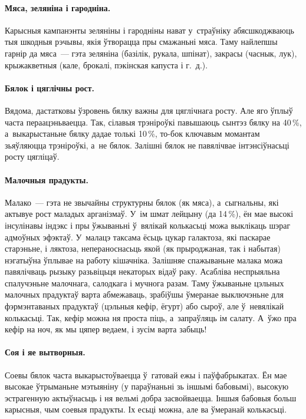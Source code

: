 \paragraph{Мяса, зеляніна і гародніна.}
Карысныя кампанэнты зеляніны і гародніны нават у~страўніку абясшкоджваюць тыя шкодныя рэчывы, якія ўтворацца пры смажаньні мяса. Таму найлепшы гарнір да мяса~--- гэта зеляніна (базілік, рукала, шпінат), закрасы (часнык, лук), крыжакветныя (кале, брокалі, пэкінская капуста і г.~д.).

\paragraph{Бялок і цяглічны рост.}
Вядома, дастатковы ўзровень бялку важны для цяглічнага росту. Але яго ўплыў часта пераацэньваецца. Так, сілавыя трэніроўкі павышаюць сынтэз бялку на 40\,\%, а~выкарыстаньне бялку дадае толькі 10\,\%, то-бок ключавым момантам зьяўляюцца трэніроўкі, а~не бялок. Залішні бялок не павялічвае інтэнсіўнасьці росту цягліцаў.

\paragraph{Малочныя прадукты.}
Малако~--- гэта не звычайны структурны бялок (як мяса), а~сыгнальны, які актывуе рост маладых арганізмаў. У~ім шмат лейцыну (да 14\,\%), ён мае высокі інсулінавы індэкс і пры ўжываньні ў~вялікай колькасьці можа выклікаць шэраг адмоўных эфэктаў. У~малацэ таксама ёсьць цукар галактоза, які паскарае старэньне, і ляктоза, непераноснасьць якой (як прыроджаная, так і набытая) нэгатыўна ўплывае на работу кішачніка. Залішняе спажываньне малака можа павялічваць рызыку разьвіцьця некаторых відаў раку. Асабліва неспрыяльна спалучэньне малочнага, салодкага і мучнога разам. Таму ўжываньне цэльных малочных прадуктаў варта абмежаваць, зрабіўшы ўмеранае выключэньне для фэрмэнтаваных прадуктаў (цэльныя кефір, ёгурт) або сыроў, але ў~невялікай колькасьці. Так, кефір можна ня проста піць, а~запраўляць ім салату. А~ўжо пра кефір на ноч, як мы цяпер ведаем, і зусім варта забыць!

\paragraph{Соя і яе вытворныя.}
Соевы бялок часта выкарыстоўваецца ў~гатовай ежы і паўфабрыкатах. Ён мае высокае ўтрыманьне мэтыяніну (у параўнаньні зь іншымі бабовымі), высокую эстрагенную актыўнасьць і ня вельмі добра засвойваецца. Іншыя бабовыя больш карысныя, чым соевыя прадукты. Іх есьці можна, але ва ўмеранай колькасьці.

